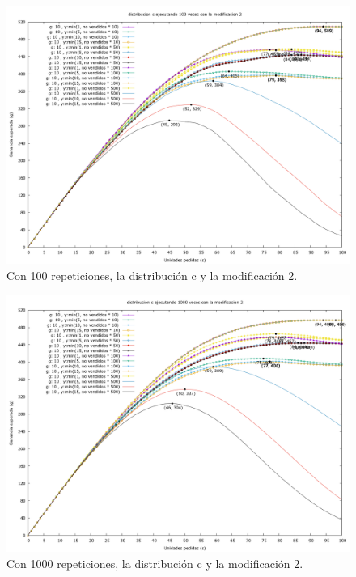 \documentclass[12pt, spanish]{article}
\begin{document}
\begin{figure}[H]
	\centering
	\includegraphics[scale = 0.2]{prob_c/datos_c_100_2.png}
	\caption{Con 100 repeticiones, la distribución c y la modificación 2.}
	\label{fig:ej1_a_100}

\end{figure}

\begin{figure}[H]
	\centering
	\includegraphics[scale = 0.2]{prob_c/datos_c_1000_2.png}
	\caption{Con 1000 repeticiones, la distribución c y la modificación 2.}
	\label{fig:ej1_a_1000}

\end{figure}
\end{document}
